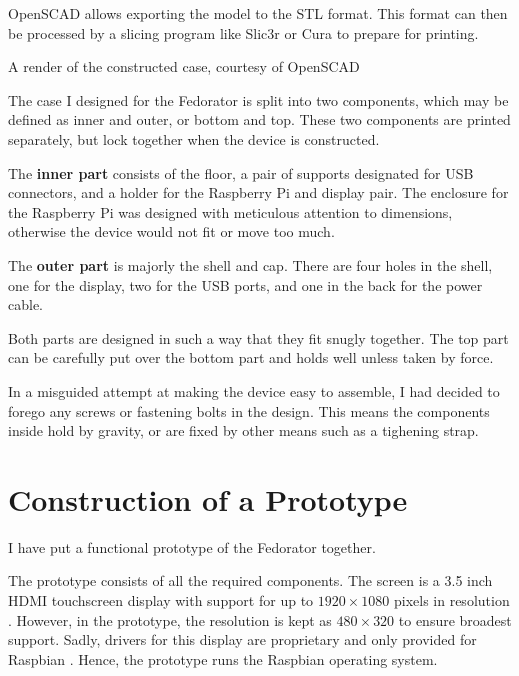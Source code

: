        OpenSCAD allows exporting the model to the STL format.  This format can then be processed by a slicing program like Slic3r or Cura to prepare for printing.
        
            {A render of the constructed case, courtesy of OpenSCAD}
        
        The case I designed for the Fedorator is split into two components, which may be defined as inner and outer, or bottom and top.  These two components are printed separately, but lock together when the device is constructed.
        
        The \textbf{inner part} consists of the floor, a pair of supports designated for USB connectors, and a holder for the Raspberry Pi and display pair.  The enclosure for the Raspberry Pi was designed with meticulous attention to dimensions, otherwise the device would not fit or move too much.
        
        The \textbf{outer part} is majorly the shell and cap.  There are four holes in the shell, one for the display, two for the USB ports, and one in the back for the power cable.
        
        Both parts are designed in such a way that they fit snugly together.  The top part can be carefully put over the bottom part and holds well unless taken by force.
        
        In a misguided attempt at making the device easy to assemble, I had decided to forego any screws or fastening bolts in the design.  This means the components inside hold by gravity, or are fixed by other means such as a tighening strap.
        
        
    \section{Construction of a Prototype}
        I have put a functional prototype of the Fedorator together.
        
        The prototype consists of all the required components.  The screen is a 3.5 inch HDMI touchscreen display with support for up to $1920\times1080$ pixels in resolution \cite{aliexpress-touchscreen}.  However, in the prototype, the resolution is kept as $480\times320$ to ensure broadest support.  Sadly, drivers for this display are proprietary and only provided for Raspbian \cite{osoyoo-drivers}.  Hence, the prototype runs the Raspbian operating system.
        
